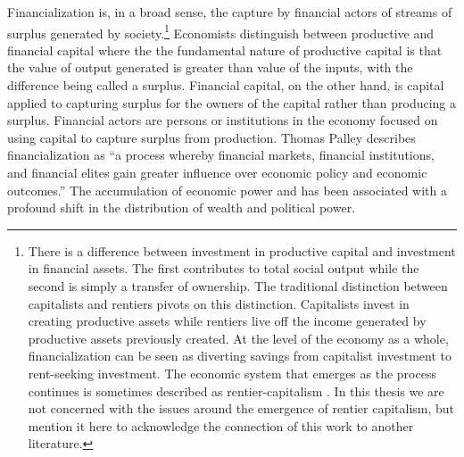 Financialization is, in a broad sense, the capture by financial actors of streams of surplus generated by society.\footnote{There is a difference between investment in productive capital and investment in financial assets. The first contributes to total social output while the second is simply a transfer of ownership. The traditional distinction between capitalists and \glspl{rentier} pivots on this distinction. Capitalists invest in creating productive assets while rentiers live off the income generated by productive assets previously created. At the level of the economy as a whole, financialization can be seen as diverting savings from capitalist investment to rent-seeking investment. The economic system  that emerges as the process continues is sometimes described as rentier-capitalism \cite{christophersClassAssetsWork2021,  standingCorruptionCapitalismWhy2017}. In this thesis we are not concerned with the issues around the emergence of rentier capitalism, but mention it here to acknowledge the connection of this work to another literature.}  Economists distinguish between productive and financial capital where the the fundamental nature of productive capital is that the value of output generated is greater than value of the inputs, with the difference being called a surplus. Financial capital, on the other hand, is capital applied to capturing surplus for the owners of the capital rather than producing a surplus. Financial actors are persons or institutions in the economy focused on using capital to capture surplus from production. Thomas Palley \cite{palleyFinancializationWhatIt2007} describes financialization as ``a process whereby financial markets, financial institutions, and financial elites gain greater influence over economic policy and economic outcomes.'' The accumulation of economic power and has been associated with a profound shift in the distribution of wealth and political power. %

